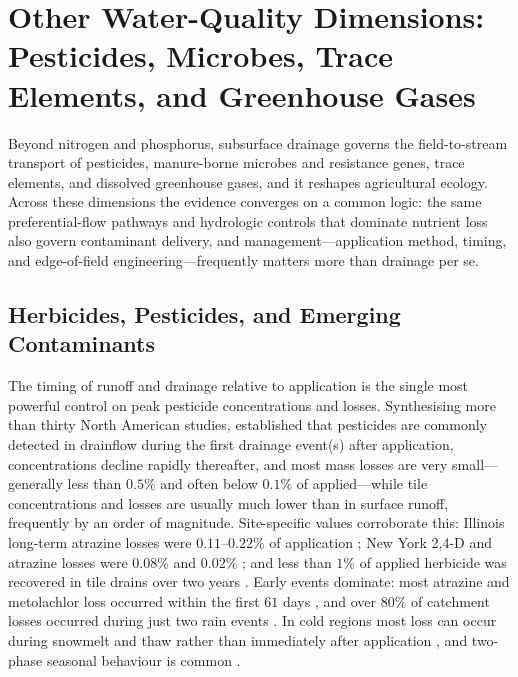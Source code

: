 \section{Other Water-Quality Dimensions: Pesticides, Microbes, Trace Elements, and Greenhouse Gases}

Beyond nitrogen and phosphorus, subsurface drainage governs the field-to-stream
transport of pesticides, manure-borne microbes and resistance genes, trace
elements, and dissolved greenhouse gases, and it reshapes agricultural ecology.
Across these dimensions the evidence converges on a common logic: the same
preferential-flow pathways and hydrologic controls that dominate nutrient loss
also govern contaminant delivery, and management---application method, timing,
and edge-of-field engineering---frequently matters more than drainage per se.

\subsection{Herbicides, Pesticides, and Emerging Contaminants}

The timing of runoff and drainage relative to application is the single most
powerful control on peak pesticide concentrations and losses. Synthesising more
than thirty North American studies, \textcite{Kladivko2001} established that
pesticides are commonly detected in drainflow during the first drainage event(s)
after application, concentrations decline rapidly thereafter, and most mass
losses are very small---generally less than $0.5\%$ and often below $0.1\%$ of
applied---while tile concentrations and losses are usually much lower than in
surface runoff, frequently by an order of magnitude. Site-specific values
corroborate this: Illinois long-term atrazine losses were $0.11$--$0.22\%$ of
application \parencite{Kalita2006}; New York 2,4-D and atrazine losses were
$0.08\%$ and $0.02\%$ \parencite{Shalit1996}; and less than $1\%$ of applied
herbicide was recovered in tile drains over two years
\parencite{Fortin2002,Siimes2006}. Early events dominate: most atrazine and
metolachlor loss occurred within the first $61$ days \parencite{SOUTHWICK1990},
and over $80\%$ of catchment losses occurred during just two rain events
\parencite{Leu2004}. In cold regions most loss can occur during snowmelt and
thaw rather than immediately after application \parencite{Siimes2006}, and
two-phase seasonal behaviour is common \parencite{Novak2001,Dousset2004}.

